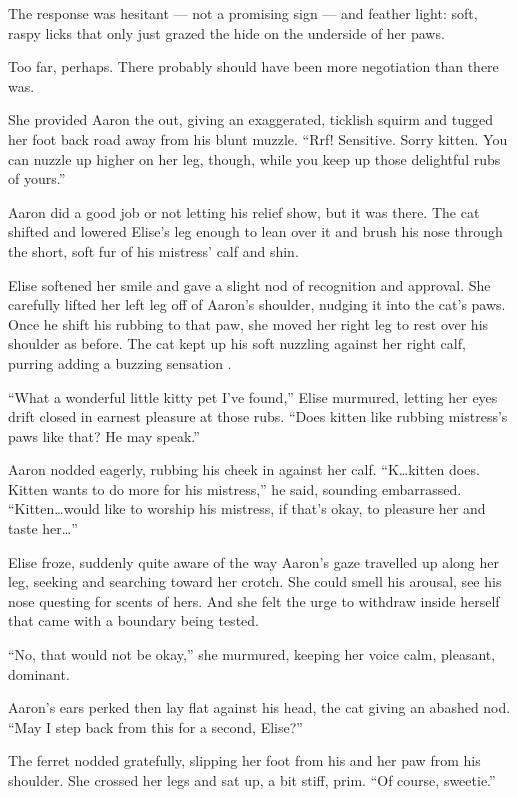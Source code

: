 \documentclass[12pt,letterpaper,oneside]{memoir}
\begin{document}
  The response was hesitant --- not a promising sign --- and feather light: soft, raspy licks that only just grazed the hide on the underside of her paws.

  Too far, perhaps. There probably should have been more negotiation than there was.

  She provided Aaron the out, giving an exaggerated, ticklish squirm and tugged her foot back road away from his blunt muzzle. ``Rrf! Sensitive. Sorry kitten. You can nuzzle up higher on her leg, though, while you keep up those delightful rubs of yours.''

  Aaron did a good job or not letting his relief show, but it was there. The cat shifted and lowered Elise's leg enough to lean over it and brush his nose through the short, soft fur of his mistress' calf and shin.

  Elise softened her smile and gave a slight nod of recognition and approval. She carefully lifted her left leg off of Aaron's shoulder, nudging it into the cat's paws. Once he shift his rubbing to that paw, she moved her right leg to rest over his shoulder as before. The cat kept up his soft nuzzling against her right calf, purring adding a buzzing sensation .

  ``What a wonderful little kitty pet I've found,'' Elise murmured, letting her eyes drift closed in earnest pleasure at those rubs. ``Does kitten like rubbing mistress's paws like that? He may speak.''

  Aaron nodded eagerly, rubbing his cheek in against her calf. ``K\ldots{}kitten does. Kitten wants to do more for his mistress,'' he said, sounding embarrassed. ``Kitten\ldots{}would like to worship his mistress, if that's okay, to pleasure her and taste her\ldots{}''

  Elise froze, suddenly quite aware of the way Aaron's gaze travelled up along her leg, seeking and searching toward her crotch. She could smell his arousal, see his nose questing for scents of hers. And she felt the urge to withdraw inside herself that came with a boundary being tested.

  ``No, that would not be okay,'' she murmured, keeping her voice calm, pleasant, dominant.

  Aaron's ears perked then lay flat against his head, the cat giving an abashed nod. ``May I step back from this for a second, Elise?''

  The ferret nodded gratefully, slipping her foot from his and her paw from his shoulder. She crossed her legs and sat up, a bit stiff, prim. ``Of course, sweetie.''
\end{document}
